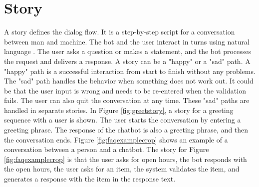 \section{Story}
A story defines the dialog flow. 
It is a step-by-step script for a conversation between man and machine.
The bot and the user interact in turns using natural language \cite{evaluateChatbotsShawar2007, shawar2007chatbots, huang2007extracting, gregori2017evaluation}.
The user asks a question or makes a statement, and the bot processes the request and delivers a response.
A story can be a "happy" or a "sad" path.
A "happy" path is a successful interaction from start to finish without any problems.
The "sad" path handles the behavior when something does not work out.
It could be that the user input is wrong and needs to be re-entered when the validation fails.
The user can also quit the conversation at any time.
These "sad" paths are handled in separate stories.
In Figure \ref{fig:greetstory}, a story for a greeting sequence with a user is shown. 
The user starts the conversation by entering a greeting phrase. 
The response of the chatbot is also a greeting phrase, and then the conversation ends. 
Figure \ref{fig:faqexamplecrop} shows an example of a conversation between a person and a chatbot.
The story for Figure \ref{fig:faqexamplecrop} is that the user asks for open hours, the bot responds with the open hours, the user asks for an item, the system validates the item, and generates a response with 
the item in the response text.


